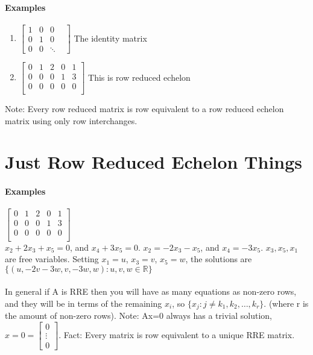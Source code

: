 \documentclass[10pt,letter]{article}
\begin{document}
\paragraph*{Examples}
\begin{enumerate}
    \item $\begin{bmatrix}
    1 & 0 & 0 &  \\
    0 & 1 & 0 &  \\
    0 & 0 & \ddots &   
\end{bmatrix}$ The identity matrix  
\item $\begin{bmatrix}
    0 & 1 & 2 & 0 & 1 \\
    0 & 0 & 0 & 1 & 3 \\
    0 & 0 & 0 & 0 & 0 \\  
\end{bmatrix}$ This is row reduced echelon
\end{enumerate}
Note: Every row reduced matrix is row equivalent to a row reduced echelon matrix using only row interchanges. 


\section*{Just Row Reduced Echelon Things}

\paragraph*{Examples}
 $\begin{bmatrix}
    0 & 1 & 2 & 0 & 1 \\
    0 & 0 & 0 & 1 & 3 \\
    0 & 0 & 0 & 0 & 0 \\  
\end{bmatrix}$ \\ 
$x_2+2x_3+x_5=0$, and $x_4+3x_5=0$. $x_2 = -2x_3-x_5$, and $x_4 = -3x_5$. $x_3,x_5,x_1$ are free variables. Setting $x_1=u$, $x_3=v$, $x_5=w$, the solutions are $\{(u,-2v-3w,v,-3w,w):u,v,w\in\mathbb{R}\}$ 

\paragraph{}
In general if A is RRE then you will have as many equations as non-zero rows, and they will be in terms of the remaining $x_i$, so $\{x_j: j \neq k_1,k_2,\ldots,k_r\}$. (where r is the amount of non-zero rows). Note: Ax=0 always has a trivial solution, $x=0=\begin{bmatrix}0\\ \vdots \\ 0\end{bmatrix}$. Fact: Every matrix is row equivalent to a unique RRE matrix. 
\end{document}
